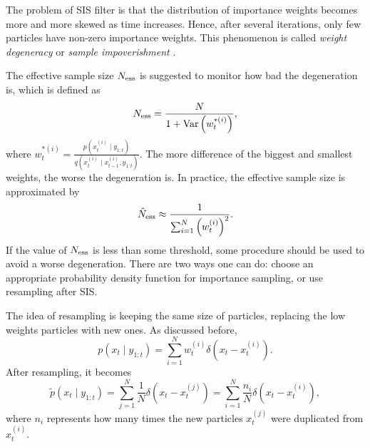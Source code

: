 The problem of SIS filter is that the distribution of importance weights becomes more and more skewed as time increases. Hence, after several iterations, only few particles have non-zero importance weights. This phenomenon is called \textit{weight degeneracy} or \textit{sample impoverishment} \citep{smcmip2011}.

The effective sample size $N_{\mbox{\scriptsize ess}}$ is suggested to monitor how bad the degeneration is, which is defined as 
\begin{equation}
N_{\mbox{\scriptsize ess}}=\frac{N}{1+\mathrm{Var}\left(w_t^{*(i)}\right)},
\end{equation}
where $w_t^{*(i)}=\frac{p\left(x_t^{(i)}\mid y_{1:t}\right)}{q\left(x_t^{(i)}\mid x_{t-1}^{(i)},y_{1:t}\right)}$. The more difference of the biggest and smallest weights, the worse the degeneration is. In practice, the effective sample size is approximated by
\begin{equation}
\hat{N}_{\mbox{\scriptsize ess}}\approx \frac{1}{\sum_{i=1}^{N}\left(w_t^{(i)}\right)^2}.
\end{equation}
If the value of $N_{\mbox{\scriptsize ess}}$ is less than some threshold, some procedure should be used to avoid a worse degeneration. There are two ways one can do: choose an appropriate probability density function for importance sampling, or use resampling after SIS. 

The idea of resampling is keeping the same size of particles, replacing the low weights particles with new ones. As discussed before, 
\begin{equation}
p(x_t \mid y_{1:t})=\sum_{i=1}^Nw_t^{(i)} \delta \left(x_t -x_t^{(i)}\right).
\end{equation}
After resampling, it becomes
\begin{equation}
\tilde{p}(x_t \mid y_{1:t})=\sum_{j=1}^N\frac{1}{N} \delta \left(x_t -x_t^{(j)}\right)= \sum_{i=1}^N\frac{n_i}{N} \delta \left(x_t -x_t^{(i)}\right),
\end{equation}
where $n_i$ represents how many times the new particles $x_t^{(j)}$ were duplicated from$x_t^{(i)}$. 

